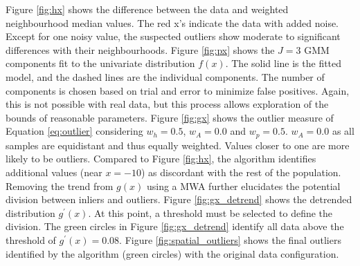 Figure \ref{fig:hx} shows the difference between the data and weighted neighbourhood median values. The red x's indicate the data with added noise. Except for one noisy value, the suspected outliers show moderate to significant differences with their neighbourhoods. Figure \ref{fig:px} shows the $J=3$ \gls{GMM} components fit to the univariate distribution $f(x)$. The solid line is the fitted model, and the dashed lines are the individual components. The number of components is chosen based on trial and error to minimize false positives. Again, this is not possible with real data, but this process allows exploration of the bounds of reasonable parameters. Figure \ref{fig:gx} shows the outlier measure of Equation \ref{eq:outlier} considering $w_{h}=0.5$, $w_{A}=0.0$ and $w_{p}=0.5$. $w_{A}=0.0$ as all samples are equidistant and thus equally weighted. Values closer to one are more likely to be outliers. Compared to Figure \ref{fig:hx}, the algorithm identifies additional values (near $x=-10$) as discordant with the rest of the population. Removing the trend from $g(x)$ using a \gls{MWA} further elucidates the potential division between inliers and outliers. Figure \ref{fig:gx_detrend} shows the detrended distribution $g^{\prime}(x)$. At this point, a threshold must be selected to define the division. The green circles in Figure \ref{fig:gx_detrend} identify all data above the threshold of $g^{\prime}(x)=0.08$. Figure \ref{fig:spatial_outliers} shows the final outliers identified by the algorithm (green circles) with the original data configuration.

